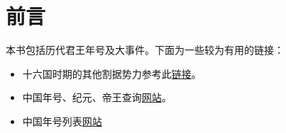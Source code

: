 
\chapter{前言}

本书包括历代君王年号及大事件。下面为一些较为有用的链接：

\begin{itemize}
  \small \kaiti
  \item 十六国时期的其他割据势力参考此\href{https://zh.wikipedia.org/wiki/%E4%BA%94%E8%83%A1%E5%8D%81%E5%85%AD%E5%9B%BD#%E5%85%B6%E4%BB%96}{链接}。
  \item 中国年号、纪元、帝王查询\href{http://www.chinese-artists.net/year/}{网站}。
  \item 中国年号列表\href{https://zh.wikipedia.org/wiki/%E4%B8%AD%E5%9B%BD%E5%B9%B4%E5%8F%B7%E5%88%97%E8%A1%A8}{网站}
\end{itemize}

